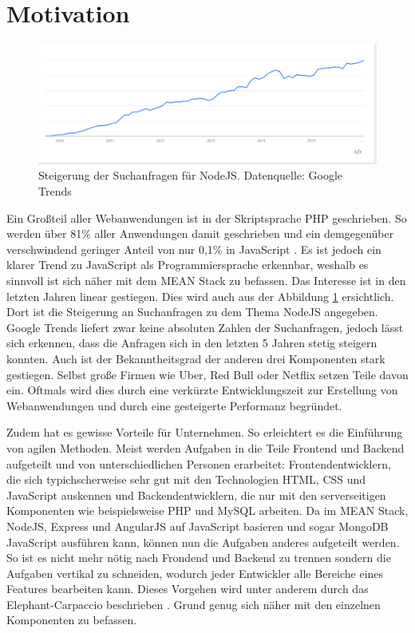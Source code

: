 \section{Motivation}
\label{motivation}

\begin{figure}[b]
	\centering
	\includegraphics[width=0.7\linewidth]{figures/NodeJS.png}
	\caption{Steigerung der Suchanfragen für NodeJS. Datenquelle: Google Trends \cite{googleTrends:nodeJS}}
	\label{f:motivation:nodejs}
\end{figure}

Ein Großteil aller Webanwendungen ist in der Skriptsprache PHP geschrieben. 
So werden über 81\% aller Anwendungen damit geschrieben und ein demgegenüber verschwindend geringer Anteil von nur 0,1\% in JavaScript \cite{w3techs:serversidePLUsage}.
Es ist jedoch ein klarer Trend zu JavaScript als Programmiersprache erkennbar, weshalb es sinnvoll ist sich näher mit dem MEAN Stack zu befassen.
Das Interesse ist in den letzten Jahren linear gestiegen.
Dies wird auch aus der Abbildung \ref{f:motivation:nodejs} ersichtlich.
Dort ist die Steigerung an Suchanfragen zu dem Thema NodeJS angegeben.
Google Trends liefert zwar keine absoluten Zahlen der Suchanfragen, jedoch lässt sich erkennen, dass die Anfragen sich in den letzten 5 Jahren stetig steigern konnten. 
Auch ist der Bekanntheitsgrad der anderen drei Komponenten stark gestiegen.
Selbst große Firmen wie Uber\cite{buildwith:uber.com}, Red Bull\cite{redbull:job} oder Netflix\cite{infoq:netflix} setzen Teile davon ein.
Oftmals wird dies durch eine verkürzte Entwicklungszeit zur Erstellung von Webanwendungen und durch eine gesteigerte Performanz begründet.

Zudem hat es gewisse Vorteile für Unternehmen. So erleichtert es die Einführung von agilen Methoden.
Meist werden Aufgaben in die Teile Frontend und Backend aufgeteilt und von unterschiedlichen Personen erarbeitet:
Frontendentwicklern, die sich typichscherweise sehr gut mit den Technologien HTML, CSS und JavaScript auskennen und Backendentwicklern, die nur mit den serverseitigen Komponenten wie beispielsweise PHP und MySQL arbeiten.
Da im MEAN Stack, NodeJS, Express und AngularJS auf JavaScript basieren und sogar MongoDB JavaScript ausführen kann, können nun die Aufgaben anderes aufgeteilt werden.
So ist es nicht mehr nötig nach Frondend und Backend zu trennen sondern die Aufgaben vertikal zu schneiden, wodurch jeder Entwickler alle Bereiche eines Features bearbeiten kann.
Dieses Vorgehen wird unter anderem durch das Elephant-Carpaccio beschrieben \cite{cockburn:elephant}. 
Grund genug sich näher mit den einzelnen Komponenten zu befassen.
